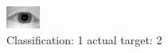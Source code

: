 \begin{figure}[h!]
\begin{center}
\includegraphics[width=0.60\columnwidth]{figures/ID963_class_1_target_2.png}
\end{center}
\caption{ Classification: 1 actual target: 2}
\label{fig:ID963_class_1_target_2}
\end{figure}
